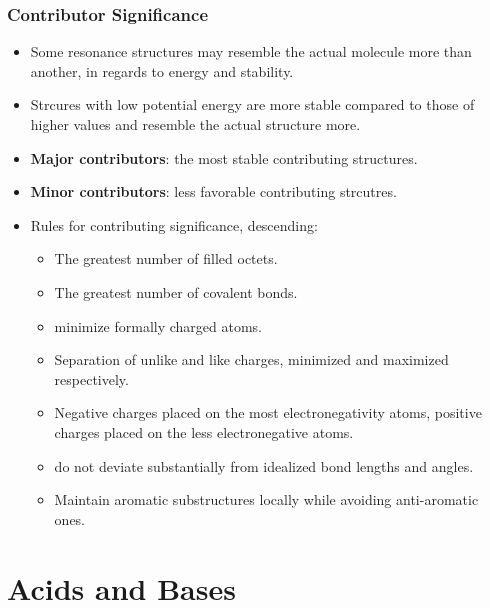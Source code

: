 \documentclass[12pt,a4paper]{article}
\begin{document}
\begin{itemize}
    \subsubsection{Contributor Significance}
    \begin{itemize}
        \item Some resonance structures may resemble the actual molecule more than another, in regards to energy and stability.
        \item Strcures with low potential energy are more stable compared to those of higher values and resemble the actual structure more.
        \item \textbf{Major contributors}: the most stable contributing structures.
        \item \textbf{Minor contributors}: less favorable contributing strcutres.
        \item Rules for contributing significance, descending:
            \begin{itemize}
                \item The greatest number of filled octets.
                \item The greatest number of covalent bonds.
                \item minimize formally charged atoms.
                \item Separation of unlike and like charges, minimized and maximized respectively.
                \item Negative charges placed on the most electronegativity atoms, positive charges placed on the less electronegative atoms.
                \item do not deviate substantially from idealized bond lengths and angles.
                \item Maintain aromatic substructures locally while avoiding anti-aromatic ones.
            \end{itemize}
    \end{itemize}
\end{itemize}

\clearpage
\section{Acids and Bases}
\end{document}
